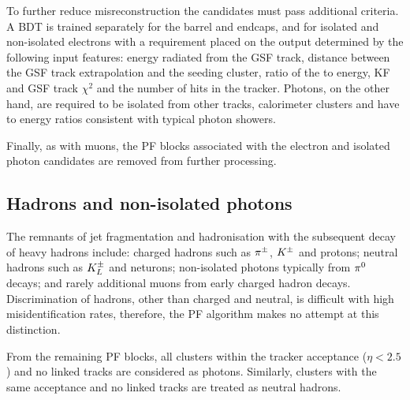 To further reduce misreconstruction the candidates must pass additional
criteria. A BDT is trained separately for the barrel and endcaps, and for
isolated and non-isolated electrons with a requirement placed on the output
determined by the following input features: energy radiated from the GSF
track, distance between the GSF track extrapolation and the \ECAL seeding
cluster, ratio of the \HCAL to \ECAL energy, KF and GSF track $\chi^2$ and the
number of hits in the tracker. Photons, on the other hand, are required to be
isolated from other tracks, calorimeter clusters and have \HCAL to \ECAL
energy ratios consistent with typical photon showers.

Finally, as with muons, the PF blocks associated with the electron and
isolated photon candidates are removed from further processing.


\subsection{Hadrons and non-isolated photons}

The remnants of jet fragmentation and hadronisation with the subsequent decay
of heavy hadrons include: charged hadrons such as $\pi^{\pm}$, $K^{\pm}$ and
protons; neutral hadrons such as $K_L^{\pm}$ and neturons; non-isolated photons
typically from $\pi^{0}$ decays; and rarely additional muons from early
charged hadron decays. Discrimination of hadrons, other than charged and
neutral, is difficult with high misidentification rates, therefore, the PF
algorithm makes no attempt at this distinction.

From the remaining PF blocks, all \ECAL clusters within the tracker acceptance (${\eta<2.5}$) and no linked tracks are considered as photons. Similarly, \HCAL clusters with the same acceptance and no linked tracks are treated as neutral hadrons.

